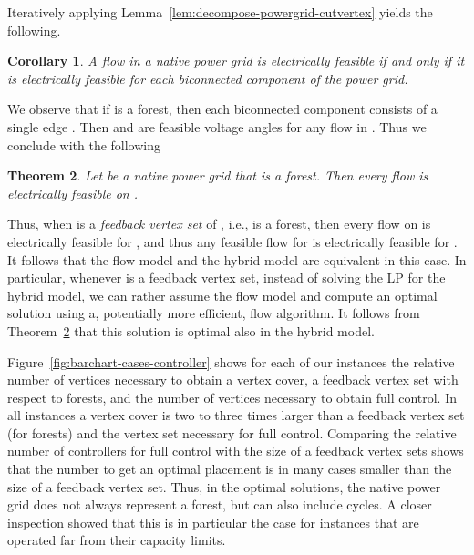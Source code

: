\documentclass{article}[11pt,a4paper]
\newtheorem{theorem}{Theorem}[section]
\newtheorem{corollary}[theorem]{Corollary}
\begin{document}
Iteratively applying Lemma~\ref{lem:decompose-powergrid-cutvertex}
yields the following.
\begin{corollary}
  \label{cor:electrical-feasible-blocks}
  A flow in a native power grid is electrically feasible if and only
  if it is electrically feasible for each biconnected component of the
  power grid.
\end{corollary}

We observe that if  is a forest, then each biconnected component
 consists of a single edge .  Then  and  are feasible voltage angles for any flow 
in . Thus we conclude with the following
\begin{theorem}
  \label{thm:fvs}
  Let  be a native power grid that is a forest.  Then every flow
   is electrically feasible on .
\end{theorem}
Thus, when  is a \emph{feedback vertex set} of , i.e.,  is
a forest, then every flow on  is electrically feasible for ,
and thus any feasible flow for  is electrically feasible for
.  It follows that the flow model and the hybrid model are
equivalent in this case.  In particular, whenever  is a feedback
vertex set, instead of solving the LP for the hybrid model, we can
rather assume the flow model and compute an optimal solution using a,
potentially more efficient, flow algorithm.  It follows from
Theorem~\ref{thm:fvs} that this solution is optimal also in the hybrid
model.

Figure~\ref{fig:barchart-cases-controller} shows for each of our
instances the relative number of vertices necessary to obtain a vertex
cover, a feedback vertex set with respect to forests, and the number
of vertices necessary to obtain full control.  In all instances a
vertex cover is two to three times larger than a feedback vertex set
(for forests) and the vertex set necessary for full control.
Comparing the relative number of controllers for full control with the
size of a feedback vertex sets shows that the number to get an optimal
placement is in many cases smaller than the size of a feedback vertex
set.  Thus, in the optimal solutions, the native power grid does not
always represent a forest, but can also include cycles.  A closer
inspection showed that this is in particular the case for instances
that are operated far from their capacity limits.
\end{document}
